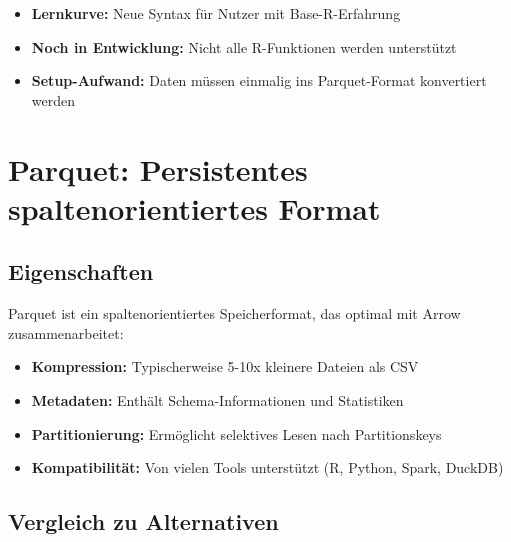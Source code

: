\documentclass[
  ngerman,
  10pt,
  letterpaper,
  twocolumn]{book}
\providecommand{\tightlist}{%
  \setlength{\itemsep}{0pt}\setlength{\parskip}{0pt}}
\let\origtable\table
\let\endorigtable\endtable
\renewenvironment{table}[1][htbp]{%
  \origtable*[#1]%
}{%
  \endorigtable*%
}
\begin{document}
\begin{itemize}
\tightlist
\item
  \textbf{Lernkurve:} Neue Syntax für Nutzer mit Base-R-Erfahrung
\item
  \textbf{Noch in Entwicklung:} Nicht alle R-Funktionen werden
  unterstützt
\item
  \textbf{Setup-Aufwand:} Daten müssen einmalig ins Parquet-Format
  konvertiert werden
\end{itemize}

\section{Parquet: Persistentes spaltenorientiertes
Format}\label{parquet-persistentes-spaltenorientiertes-format}

\subsection{Eigenschaften}\label{eigenschaften}

Parquet ist ein spaltenorientiertes Speicherformat, das optimal mit
Arrow zusammenarbeitet:

\begin{itemize}
\tightlist
\item
  \textbf{Kompression:} Typischerweise 5-10x kleinere Dateien als CSV
\item
  \textbf{Metadaten:} Enthält Schema-Informationen und Statistiken
\item
  \textbf{Partitionierung:} Ermöglicht selektives Lesen nach
  Partitionskeys
\item
  \textbf{Kompatibilität:} Von vielen Tools unterstützt (R, Python,
  Spark, DuckDB)
\end{itemize}

\subsection{Vergleich zu Alternativen}\label{vergleich-zu-alternativen}

\begin{table}

\caption{\label{tbl-format-comparison}Vergleich verschiedener
Datenformate für die BTP-Analyse}


\end{table}%
\end{document}
